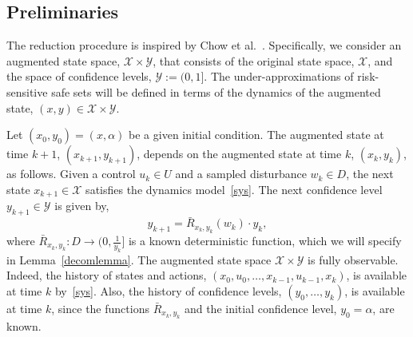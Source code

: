 \documentclass[letterpaper, 10 pt, conference]{ieeeconf}  %
\begin{document}
\subsection{Preliminaries}
The reduction procedure is inspired by Chow et al.~\cite{chow2015risk}. Specifically, we consider an augmented state space, $\mathcal{X} \times \mathcal{Y}$, that consists of the original state space, $\mathcal{X}$, 
and the space of confidence levels, $\mathcal{Y} := (0,1]$.
The under-approximations of risk-sensitive safe sets will be defined in terms of the dynamics of the augmented state,
$(x,y) \in \mathcal{X} \times \mathcal{Y}$.

Let $(x_0, y_0) = (x, \alpha)$ be a given initial condition.
The augmented state at time $k+1$, $(x_{k+1}, y_{k+1})$, depends on the augmented state at time $k$, $(x_k, y_k)$, as follows.
Given a control $u_k \in U$ and a sampled disturbance $w_k \in D$, the next state $x_{k+1} \in \mathcal{X}$ satisfies the dynamics model~\eqref{sys}. 
The next confidence level $y_{k+1} \in \mathcal{Y}$ is given by,
\begin{equation}
y_{k+1} = \bar{R}_{x_k,y_k}(w_k) \cdot y_k,\label{Rbar}
\end{equation}
where $\bar{R}_{x_k, y_k} : D \to (0, \frac{1}{y_k}]$ is a known deterministic function, 
which we will specify in Lemma~\ref{decomlemma}. 
The augmented state space $\mathcal{X} \times \mathcal{Y}$ is fully observable.
Indeed, the history of states and actions, $(x_0, u_0, \hdots, x_{k-1}, u_{k-1}, x_{k})$, is available at time $k$ by~\eqref{sys}. 
Also, the history of confidence levels, $(y_0, \hdots, y_k)$, is available at time $k$, since
the functions $\bar{R}_{x_k,y_k}$ and the initial confidence level, $y_0 = \alpha$, are known.
\end{document}
